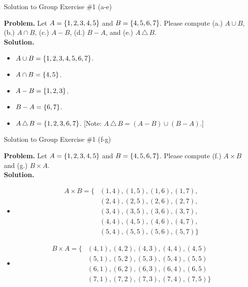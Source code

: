 \documentclass[10pt]{beamer}
\begin{document}
\begin{frame}{Solution to Group Exercise \#1 (a-e) }

\textbf{Problem.} Let $A=\{ {1,2,3,4,5} \}$ and $B=\{ {4,5,6,7} \}$. Please compute (a.) $A \cup B$, (b.) $A \cap B$, (c.) $A - B$, (d.) $B-A$, and (e.) $A \, \triangle \, B$.\\
\vfill 
\textbf{Solution.}
   \begin{itemize}
        \item[(a.)] $A \cup B = \{ {1,2,3,4,5,6,7} \}$.
        \item[(b.)] $A \cap B = \{ {4,5} \}$.  %
        \item[(c.)] $A - B = \{ {1,2,3} \}$.
        \item[(d.)] $B-A = \{ {6,7} \}$.
        \item[(e.)] $A \, \triangle \, B = \{ {1,2,3,6,7} \}$. [Note:  $A \, \triangle \, B = (A-B) \cup (B-A)$.]
    \end{itemize}

\end{frame}

\begin{frame}{Solution to Group Exercise \#1 (f-g) }

\footnotesize 
\textbf{Problem.} Let $A=\{ {1,2,3,4,5} \}$ and $B=\{ {4,5,6,7} \}$. Please compute (f.) $A \times B$ and (g.)  $B \times A$.\\

\textbf{Solution.}
   \begin{itemize}
        \item[(f.)]    
        \begin{align*}
	A \times B = \bigg\{ & (1,4),(1,5),(1,6),(1,7), \\
	& (2,4),(2,5),(2,6),(2,7), \\
& (3,4),(3,5),(3,6),(3,7), \\
 & (4,4),(4,5),(4,6),(4,7), \\
& (5,4),(5,5),(5,6),(5,7)    \bigg\}    	
    \end{align*}
        \item[(g.)]    
        \begin{align*}
	B \times A = \bigg\{ & (4,1),(4,2),(4,3),(4,4), (4,5) \\
 & (5,1),(5,2),(5,3),(5,4), (5,5) \\
 & (6,1),(6,2),(6,3),(6,4), (6,5) \\
& (7,1),(7,2),(7,3),(7,4), (7,5)   \bigg\}   
    \end{align*}
    \end{itemize}
    
\end{frame}
\end{document}
